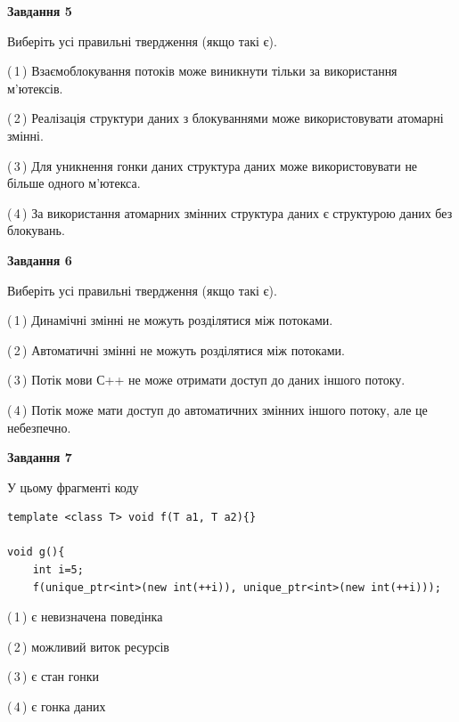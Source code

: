 \documentclass[12pt, ukrainian]{article}
\begin{document}
\begin {large}
{\begin{center}
\textbf{Завдання 5}
\end{center}

Виберіть усі правильні твердження (якщо такі є).\par
\vspace{2mm}

(\,1\,) Взаємоблокування потоків може виникнути тільки за використання м’ютексів.%

(\,2\,) Реалізація структури даних з блокуваннями може використовувати атомарні змінні.%

(\,3\,) Для уникнення гонки даних структура даних може використовувати не більше одного м’ютекса.%

(\,4\,) За використання атомарних змінних структура даних є структурою даних без блокувань.%
\newpage


\begin{center}
\textbf{Завдання 6}
\end{center}

Виберіть усі правильні твердження (якщо такі є).\par
\vspace{2mm}

(\,1\,) Динамічні змінні не можуть розділятися між потоками.%

(\,2\,) Автоматичні змінні не можуть розділятися між потоками.%

(\,3\,) Потік мови С++ не може отримати доступ до даних іншого потоку.%

(\,4\,) Потік може мати доступ до автоматичних змінних іншого потоку, але це небезпечно.%


\begin{center}
\textbf{Завдання 7}
\end{center}

У цьому фрагменті коду
\begin{verbatim}
template <class T> void f(T a1, T a2){}

void g(){
    int i=5;
    f(unique_ptr<int>(new int(++i)), unique_ptr<int>(new int(++i)));
\end{verbatim}

(\,1\,) є невизначена поведінка%

(\,2\,) можливий виток ресурсів%

(\,3\,) є стан гонки%

(\,4\,) є гонка даних%

}
\end {large}

\vspace{4mm}
\newpage
\end{document}
